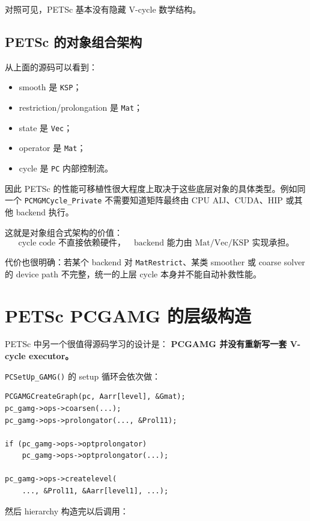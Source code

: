 对照可见，PETSc 基本没有隐藏 V-cycle 数学结构。

\subsection{PETSc 的对象组合架构}

从上面的源码可以看到：

\begin{itemize}
\item smooth 是 \texttt{KSP}；
\item restriction/prolongation 是 \texttt{Mat}；
\item state 是 \texttt{Vec}；
\item operator 是 \texttt{Mat}；
\item cycle 是 \texttt{PC} 内部控制流。
\end{itemize}

因此 PETSc 的性能可移植性很大程度上取决于这些底层对象的具体类型。例如同一个 \texttt{PCMGMCycle\_Private} 不需要知道矩阵最终由 CPU AIJ、CUDA、HIP 或其他 backend 执行。

这就是对象组合式架构的价值：
\begin{equation}
\boxed{
\text{cycle code 不直接依赖硬件，}
\quad
\text{backend 能力由 Mat/Vec/KSP 实现承担。}
}
\end{equation}

代价也很明确：若某个 backend 对 \texttt{MatRestrict}、某类 smoother 或 coarse solver 的 device path 不完整，统一的上层 cycle 本身并不能自动补救性能。

\section{PETSc PCGAMG 的层级构造}

PETSc 中另一个很值得源码学习的设计是：
\textbf{PCGAMG 并没有重新写一套 V-cycle executor。}

\texttt{PCSetUp\_GAMG()} 的 setup 循环会依次做：

\begin{verbatim}
PCGAMGCreateGraph(pc, Aarr[level], &Gmat);
pc_gamg->ops->coarsen(...);
pc_gamg->ops->prolongator(..., &Prol11);

if (pc_gamg->ops->optprolongator)
    pc_gamg->ops->optprolongator(...);

pc_gamg->ops->createlevel(
    ..., &Prol11, &Aarr[level1], ...);
\end{verbatim}

然后 hierarchy 构造完以后调用：

